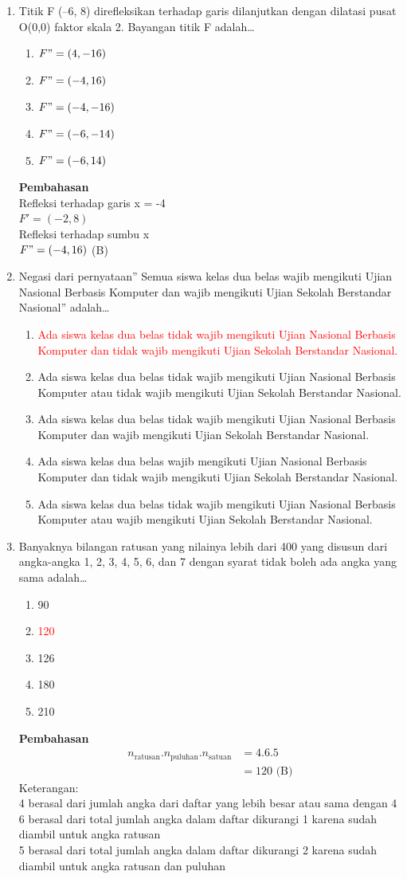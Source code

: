 \documentclass{report}
\newcommand{\options}[5]{
\begin{enumerate}[label=\alph*.]
	\item #1
	\item #2
	\item #3
	\item #4
	\item #5
\end{enumerate}
}
\newcommand{\pemb}{ \textbf{Pembahasan} \\}
\begin{document}
\begin{enumerate}
\item Titik F (–6, 8) direfleksikan terhadap garis dilanjutkan dengan dilatasi pusat O(0,0) faktor skala 2. Bayangan titik F adalah\ldots
\options
{$F"=(4,-16)$}
{\textcolor{red}{$F"=(-4,16)$}}
{$F"=(-4,-16)$}
{$F"=(-6,-14)$}
{$F"=(-6,14)$}
\pemb
Refleksi terhadap garis x = -4 \\
$F'=(-2,8)$ \\
Refleksi terhadap sumbu x \\
$F"=(-4,16)$ (B) \\

\item Negasi dari pernyataan” Semua siswa kelas dua belas wajib mengikuti Ujian Nasional Berbasis Komputer dan wajib mengikuti Ujian Sekolah Berstandar Nasional” adalah\ldots
\options
{\textcolor{red}{Ada siswa kelas dua belas tidak wajib mengikuti Ujian Nasional Berbasis Komputer dan tidak wajib mengikuti Ujian Sekolah Berstandar Nasional.}}
{Ada siswa kelas dua belas tidak wajib mengikuti Ujian Nasional Berbasis Komputer atau tidak wajib mengikuti Ujian Sekolah Berstandar Nasional.}
{Ada siswa kelas dua belas tidak wajib mengikuti Ujian Nasional Berbasis Komputer dan wajib mengikuti Ujian Sekolah Berstandar Nasional.}
{Ada siswa kelas dua belas wajib mengikuti Ujian Nasional Berbasis Komputer dan tidak wajib mengikuti Ujian Sekolah Berstandar Nasional.}
{Ada siswa kelas dua belas tidak wajib mengikuti Ujian Nasional Berbasis Komputer
atau wajib mengikuti Ujian Sekolah Berstandar Nasional.}

\item Banyaknya bilangan ratusan yang nilainya lebih dari 400 yang disusun dari angka-angka 1, 2, 3, 4, 5, 6, dan 7 dengan syarat tidak boleh ada angka yang sama adalah\ldots
\options
{90}
{\textcolor{red}{120}}
{126}
{180}
{210}
\pemb
\begin{align*}
	n_{\text{ratusan}}.n_{\text{puluhan}}.n_{\text{satuan}} 
	&= 4.6.5 \\
	&= 120 \text{ (B)}
\end{align*}
Keterangan: \\
4 berasal dari jumlah angka dari daftar yang lebih besar atau sama dengan 4 \\
6 berasal dari total jumlah angka dalam daftar dikurangi 1 karena sudah diambil untuk angka ratusan \\
5 berasal dari total jumlah angka dalam daftar dikurangi 2 karena sudah diambil untuk angka ratusan dan puluhan \\


\end{enumerate}
\end{document}
